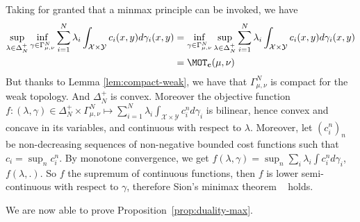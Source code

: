 \begin{prv*}
Taking for granted that a minmax principle can be invoked, we have
\begin{align*}
    \sup_{\lambda\in\Delta_N^{+}}\inf_{\gamma\in\Gamma_{\mu,\nu}^N} \sum_{i=1}^N\lambda_i\int_{\mathcal{X}\times\mathcal{Y}}c_i(x,y)d\gamma_i(x,y) &= \inf_{\gamma\in\Gamma_{\mu,\nu}^N}\sup_{\lambda\in \Delta_N^{+}} \sum_{i=1}^N\lambda_i\int_{\mathcal{X}\times\mathcal{Y}}c_i(x,y)d\gamma_i(x,y)\\
    &=\MOT_{\mathbf{c}}(\mu,\nu)
\end{align*}
But thanks to Lemma \ref{lem:compact-weak}, we have that $\Gamma_{\mu,\nu}^N$ is compact for the weak topology. And $\Delta^+_N$ is convex. Moreover the objective function $f:(\lambda,\gamma)\in\Delta^+_N\times\Gamma^N_{\mu,\nu} \mapsto \sum_{i=1}^N\lambda_i \int_{\mathcal{X}\times \mathcal{Y}} c^n_id\gamma_i$ is bilinear, hence convex and concave  in its variables, and continuous with respect to $\lambda$. Moreover, let $(c^n_i)_n$ be non-decreasing sequences of non-negative bounded cost functions such that $c_i=\sup_n c^n_i$. By monotone convergence, we get $f(\lambda,\gamma) = \sup_n \sum_i\lambda_i \int c^n_i d\gamma_i$, $f(\lambda,.)$. So $f$ the supremum of continuous functions, then $f$ is lower semi-continuous with respect to $\gamma$, therefore Sion's minimax theorem
~\citep{sion1958} holds.

\end{prv*}

We are now able to prove Proposition~\ref{prop:duality-max}.

